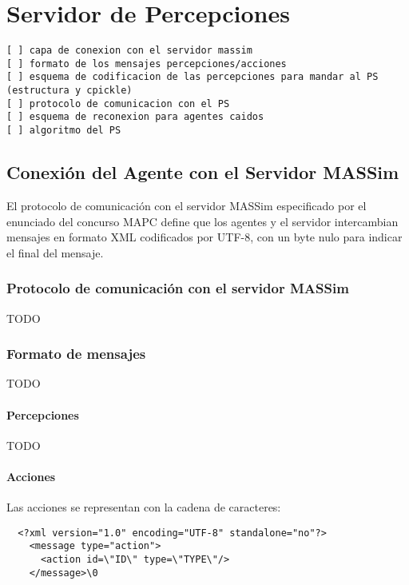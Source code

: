 
\chapter{Servidor de Percepciones}
\label{chap:servidor_de_percepciones}

\begin{verbatim}
[ ] capa de conexion con el servidor massim
[ ] formato de los mensajes percepciones/acciones
[ ] esquema de codificacion de las percepciones para mandar al PS (estructura y cpickle)
[ ] protocolo de comunicacion con el PS
[ ] esquema de reconexion para agentes caidos
[ ] algoritmo del PS
\end{verbatim}

\section{Conexión del Agente con el Servidor MASSim}

El protocolo de comunicación con el servidor MASSim especificado por 
el enunciado del concurso MAPC define que los agentes y el servidor 
intercambian mensajes en formato XML codificados por UTF-8, con un 
byte nulo para indicar el final del mensaje. 

\subsection{Protocolo de comunicación con el servidor MASSim}

TODO

\subsection{Formato de mensajes}

TODO

\subsubsection{Percepciones}

TODO

\subsubsection{Acciones}

  Las acciones se representan con la cadena de caracteres:
  
  \begin{verbatim}
  <?xml version="1.0" encoding="UTF-8" standalone="no"?>
    <message type="action">
      <action id=\"ID\" type=\"TYPE\"/>
    </message>\0
  \end{verbatim}
  
